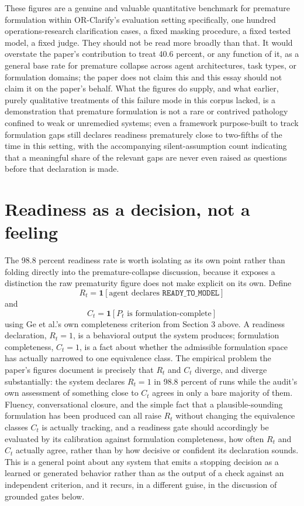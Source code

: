 \documentclass[11pt]{article}
\begin{document}
These figures are a genuine and valuable quantitative benchmark for premature formulation within OR-Clarify's evaluation setting specifically, one hundred operations-research clarification cases, a fixed masking procedure, a fixed tested model, a fixed judge. They should not be read more broadly than that. It would overstate the paper's contribution to treat 40.6 percent, or any function of it, as a general base rate for premature collapse across agent architectures, task types, or formulation domains; the paper does not claim this and this essay should not claim it on the paper's behalf. What the figures do supply, and what earlier, purely qualitative treatments of this failure mode in this corpus lacked, is a demonstration that premature formulation is not a rare or contrived pathology confined to weak or unremedied systems; even a framework purpose-built to track formulation gaps still declares readiness prematurely close to two-fifths of the time in this setting, with the accompanying silent-assumption count indicating that a meaningful share of the relevant gaps are never even raised as questions before that declaration is made.

\section{Readiness as a decision, not a feeling}

The 98.8 percent readiness rate is worth isolating as its own point rather than folding directly into the premature-collapse discussion, because it exposes a distinction the raw prematurity figure does not make explicit on its own. Define
$$R_t = \mathbf{1}[\text{agent declares } \texttt{READY\_TO\_MODEL}]$$
and
$$C_t = \mathbf{1}[P_t \text{ is formulation-complete}]$$
using Ge et al.'s own completeness criterion from Section 3 above. A readiness declaration, $R_t = 1$, is a behavioral output the system produces; formulation completeness, $C_t = 1$, is a fact about whether the admissible formulation space has actually narrowed to one equivalence class. The empirical problem the paper's figures document is precisely that $R_t$ and $C_t$ diverge, and diverge substantially: the system declares $R_t = 1$ in 98.8 percent of runs while the audit's own assessment of something close to $C_t$ agrees in only a bare majority of them. Fluency, conversational closure, and the simple fact that a plausible-sounding formulation has been produced can all raise $R_t$ without changing the equivalence classes $C_t$ is actually tracking, and a readiness gate should accordingly be evaluated by its calibration against formulation completeness, how often $R_t$ and $C_t$ actually agree, rather than by how decisive or confident its declaration sounds. This is a general point about any system that emits a stopping decision as a learned or generated behavior rather than as the output of a check against an independent criterion, and it recurs, in a different guise, in the discussion of grounded gates below.
\end{document}
